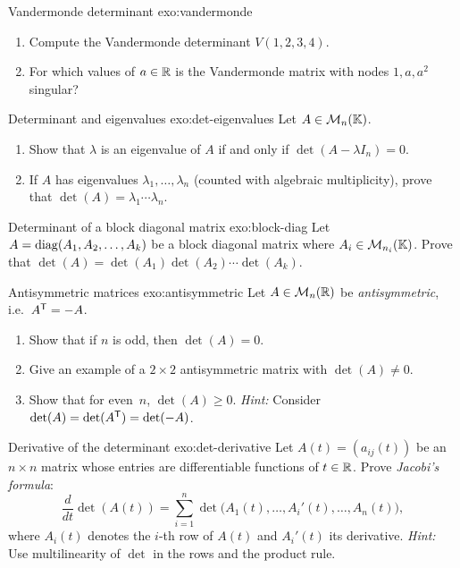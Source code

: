 \begin{exercise}{Vandermonde determinant \intermediate}{exo:vandermonde}
\begin{enumerate}[label=(\alph*)]
  \item Compute the Vandermonde determinant $V(1,2,3,4)$.
  \item For which values of $a\in{\mathbb{R}}$ is the Vandermonde matrix
    with nodes $1,a,a^2$ singular?
\end{enumerate}
\end{exercise}

\begin{exercise}{Determinant and eigenvalues \intermediate}{exo:det-eigenvalues}
Let $A\in\mathcal{M}_n({\mathbb{K}})$.
\begin{enumerate}[label=(\alph*)]
  \item Show that $\lambda$ is an eigenvalue of $A$ if and only if
    $\det(A-\lambda I_n)=0$.
  \item If $A$ has eigenvalues $\lambda_1,\ldots,\lambda_n$
    (counted with algebraic multiplicity), prove that
    $\det(A)=\lambda_1\cdots\lambda_n$.
\end{enumerate}
\end{exercise}

\begin{exercise}{Determinant of a block diagonal matrix \basic}{exo:block-diag}
Let $A=\operatorname{diag}(A_1,A_2,\ldots,A_k)$ be a block diagonal matrix where
$A_i\in\mathcal{M}_{n_i}({\mathbb{K}})$. Prove that
$\det(A)=\det(A_1)\det(A_2)\cdots\det(A_k)$.
\end{exercise}

\begin{exercise}{Antisymmetric matrices \intermediate}{exo:antisymmetric}
Let $A\in\mathcal{M}_n({\mathbb{R}})$ be \emph{antisymmetric}, i.e.\
${A}^{\mathsf{T}}=-A$.
\begin{enumerate}[label=(\alph*)]
  \item Show that if $n$ is odd, then $\det(A)=0$.
  \item Give an example of a $2\times 2$ antisymmetric matrix
    with $\det(A)\neq 0$.
  \item Show that for even~$n$, $\det(A)\geq 0$.
    \textit{Hint:} Consider $\det(A)=\det({A}^{\mathsf{T}})=\det(-A)$.
\end{enumerate}
\end{exercise}

\begin{exercise}{Derivative of the determinant \challenging}{exo:det-derivative}
\index{determinant!derivative}
Let $A(t)=(a_{ij}(t))$ be an $n\times n$ matrix whose entries are
differentiable functions of $t\in{\mathbb{R}}$. Prove \emph{Jacobi's formula}:
\[
  \frac{d}{dt}\det(A(t))
  = \sum_{i=1}^n \det\bigl(A_1(t),\ldots,A_i'(t),\ldots,A_n(t)\bigr),
\]
where $A_i(t)$ denotes the $i$-th row of $A(t)$ and $A_i'(t)$ its
derivative.
\textit{Hint:} Use multilinearity of $\det$ in the rows and the
product rule.
\end{exercise}

